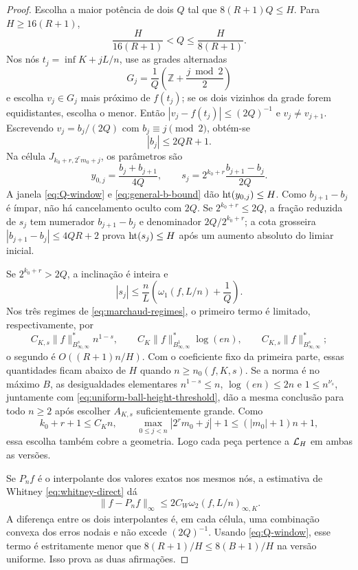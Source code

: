 \begin{proof}
Escolha a maior potência de dois $Q$ tal que
$8(R+1)Q\le H$. Para $H\ge16(R+1)$,
\begin{equation}
 \frac{H}{16(R+1)}<Q\le\frac{H}{8(R+1)}.
 \label{eq:Q-window}
\end{equation}
Nos nós $t_j=\inf K+jL/n$, use as grades alternadas
\[
 G_j=\frac1Q\left(\mathbb Z+\frac{j\bmod2}{2}\right)
\]
e escolha $v_j\in G_j$ mais próximo de $f(t_j)$; se os dois vizinhos da grade
forem equidistantes, escolha o menor. Então
$|v_j-f(t_j)|\le(2Q)^{-1}$ e $v_j\ne v_{j+1}$. Escrevendo
$v_j=b_j/(2Q)$ com $b_j\equiv j\pmod2$, obtém-se
\begin{equation}
 |b_j|\le2QR+1.
 \label{eq:general-b-bound}
\end{equation}
Na célula $J_{k_0+r,2^rm_0+j}$, os parâmetros são
\begin{equation}
 y_{0,j}=\frac{b_j+b_{j+1}}{4Q},
 \qquad
 s_j=2^{k_0+r}\frac{b_{j+1}-b_j}{2Q}.
 \label{eq:general-atom-parameters}
\end{equation}
A janela \eqref{eq:Q-window} e \eqref{eq:general-b-bound} dão
$\operatorname{ht}(y_{0,j})\le H$. Como $b_{j+1}-b_j$ é ímpar, não há cancelamento
oculto com $2Q$. Se $2^{k_0+r}\le2Q$, a fração reduzida de $s_j$ tem
numerador $b_{j+1}-b_j$ e denominador $2Q/2^{k_0+r}$; a cota grosseira
$|b_{j+1}-b_j|\le4QR+2$ prova $\operatorname{ht}(s_j)\le H$ após um aumento absoluto
do limiar inicial.

Se $2^{k_0+r}>2Q$, a inclinação é inteira e
\begin{equation}
 |s_j|
 \le \frac nL\left(\omega_1(f,L/n)+\frac1Q\right).
 \label{eq:slope-marchaud-bound}
\end{equation}
Nos três regimes de \eqref{eq:marchaud-regimes}, o primeiro termo é limitado,
respectivamente, por
\[
 C_{K,s}\|f\|_{B^s_{\infty,\infty}}^*n^{1-s},\qquad
 C_{K}\|f\|_{B^1_{\infty,\infty}}^*\log(en),\qquad
 C_{K,s}\|f\|_{B^s_{\infty,\infty}}^*;
\]
o segundo é $O((R+1)n/H)$. Com o coeficiente fixo da primeira parte, essas
quantidades ficam abaixo de $H$ quando $n\ge n_0(f,K,s)$. Se a norma é no
máximo $B$, as desigualdades elementares
$n^{1-s}\le n$, $\log(en)\le2n$ e $1\le n^{\nu_s}$, juntamente com
\eqref{eq:uniform-ball-height-threshold}, dão a mesma conclusão para todo
$n\ge2$ após escolher $A_{K,s}$ suficientemente grande. Como
\[
 k_0+r+1\le C_Kn,\qquad
 \max_{0\le j<n}|2^rm_0+j|+1\le(|m_0|+1)n+1,
\]
essa escolha também cobre a geometria. Logo cada peça pertence a
$\mathcal{L}_H$ em ambas as versões.

Se $P_nf$ é o interpolante dos valores exatos nos mesmos nós, a estimativa
de Whitney \eqref{eq:whitney-direct} dá
\[
 \|f-P_nf\|_\infty
 \le2C_W\omega_2(f,L/n)_{\infty,K}.
\]
A diferença entre os dois interpolantes é, em cada célula, uma combinação
convexa dos erros nodais e não excede $(2Q)^{-1}$. Usando
\eqref{eq:Q-window}, esse termo é estritamente menor que
$8(R+1)/H\le8(B+1)/H$ na versão uniforme. Isso prova as duas afirmações.
\end{proof}

